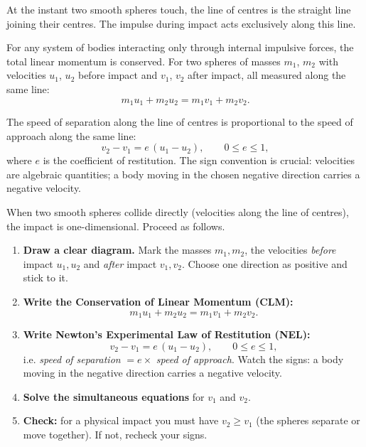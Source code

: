 \documentclass[11pt]{article}
\newcommand{\cle}[1]{{\popxbold\color{popdark}#1}}
\begin{document}
\begin{definition}
At the instant two smooth spheres touch, the \cle{line of centres} is the straight line joining their centres. The impulse during impact acts exclusively along this line.
\end{definition}

\begin{propriete}
For any system of bodies interacting only through internal impulsive forces, the total linear momentum is conserved. For two spheres of masses $m_1$, $m_2$ with velocities $u_1$, $u_2$ before impact and $v_1$, $v_2$ after impact, all measured along the same line:
\[ m_1 u_1 + m_2 u_2 = m_1 v_1 + m_2 v_2. \]
\end{propriete}

\begin{propriete}
The speed of separation along the line of centres is proportional to the speed of approach along the same line:
\[ v_2 - v_1 = e\,(u_1 - u_2), \qquad 0 \le e \le 1, \]
where $e$ is the \cle{coefficient of restitution}. The sign convention is crucial: velocities are algebraic quantities; a body moving in the chosen negative direction carries a negative velocity.
\end{propriete}

\begin{methode}
When two smooth spheres collide \cle{directly} (velocities along the line of centres), the impact is one-dimensional. Proceed as follows.
\begin{enumerate}
\item \textbf{Draw a clear diagram.} Mark the masses $m_1, m_2$, the velocities \emph{before} impact $u_1, u_2$ and \emph{after} impact $v_1, v_2$. Choose one direction as positive and stick to it.
\item \textbf{Write the Conservation of Linear Momentum (CLM):}
\[ m_1 u_1 + m_2 u_2 = m_1 v_1 + m_2 v_2. \]
\item \textbf{Write Newton's Experimental Law of Restitution (NEL):}
\[ v_2 - v_1 = e\,(u_1 - u_2), \qquad 0 \le e \le 1, \]
i.e. \emph{speed of separation} $= e \times$ \emph{speed of approach}. Watch the signs: a body moving in the negative direction carries a negative velocity.
\item \textbf{Solve the simultaneous equations} for $v_1$ and $v_2$.
\item \textbf{Check:} for a physical impact you must have $v_2 \ge v_1$ (the spheres separate or move together). If not, recheck your signs.
\end{enumerate}
\end{methode}
\end{document}
